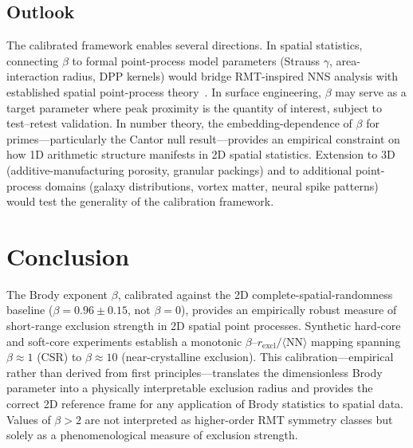 \documentclass[final,3p,times,twocolumn]{elsarticle}
\theoremstyle{definition}
\begin{document}
\subsection{Outlook}

The calibrated framework enables several directions. In spatial
statistics, connecting $\beta$ to formal point-process model parameters
(Strauss $\gamma$, area-interaction radius, DPP kernels) would bridge
RMT-inspired NNS analysis with established spatial point-process
theory~\cite{FORRESTER-2010}. In surface engineering, $\beta$ may serve
as a target parameter where peak proximity is the quantity of interest,
subject to test--retest validation. In number theory, the
embedding-dependence of $\beta$ for primes---particularly the Cantor
null result---provides an empirical constraint on how 1D arithmetic
structure manifests in 2D spatial statistics. Extension to 3D
(additive-manufacturing porosity, granular packings) and to additional
point-process domains (galaxy distributions, vortex matter, neural
spike patterns) would test the generality of the calibration
framework.

\section{Conclusion}

The Brody exponent $\beta$, calibrated against the 2D complete-spatial-randomness
baseline ($\beta = 0.96 \pm 0.15$, not $\beta = 0$), provides an empirically
robust measure of short-range exclusion strength in 2D spatial
point processes. Synthetic hard-core and soft-core experiments establish a
monotonic $\beta$--$r_{\text{excl}}/\langle\text{NN}\rangle$ mapping spanning
$\beta \approx 1$ (CSR) to $\beta \approx 10$ (near-crystalline exclusion).
This calibration---empirical rather than derived from first principles---translates
the dimensionless Brody parameter into a physically interpretable exclusion
radius and provides the correct 2D reference frame for any application of
Brody statistics to spatial data. Values of $\beta>2$ are not interpreted
as higher-order RMT symmetry classes but solely as a phenomenological
measure of exclusion strength.
\end{document}
